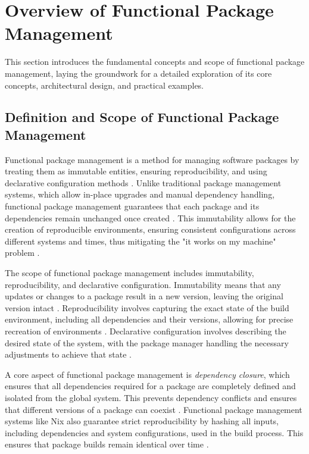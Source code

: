\section{Overview of Functional Package Management}

This section introduces the fundamental concepts and scope of functional package
management, laying the groundwork for a detailed exploration of its core concepts,
architectural design, and practical examples.

\subsection{Definition and Scope of Functional Package Management}

Functional package management is a method for managing software packages by treating
them as immutable entities, ensuring reproducibility, and using declarative configuration
methods \cite[Section 2.1]{courtesFunctionalPackageManagement2013}. Unlike traditional
package management systems, which allow in-place upgrades and manual dependency handling,
functional package management guarantees that each package and its dependencies remain
unchanged once created \cite[Section 2.2]{courtesFunctionalPackageManagement2013}.
This immutability allows for the creation of reproducible environments, ensuring
consistent configurations across different systems and times, thus mitigating the
"it works on my machine" problem \cite[Section 2, Page 5]{rahmanWorksMeCannot2022}.

The scope of functional package management includes immutability, reproducibility,
and declarative configuration. Immutability means that any updates or changes to a
package result in a new version, leaving the original version intact
\cite[Page 84]{dolstraNixSafePolicyFree2004}. Reproducibility involves capturing
the exact state of the build environment, including all dependencies and their
versions, allowing for precise recreation of environments
\cite[Section 2.1]{courtesFunctionalPackageManagement2013}. Declarative configuration
involves describing the desired state of the system, with the package manager handling
the necessary adjustments to achieve that state \cite[Section 2.1]{courtesFunctionalPackageManagement2013}.

A core aspect of functional package management is \textit{dependency closure}, which
ensures that all dependencies required for a package are completely defined and isolated
from the global system. This prevents dependency conflicts and ensures that different
versions of a package can coexist \cite[Chapter 3.3]{dolstraPurelyFunctionalSoftware2006}.
Functional package management systems like Nix also guarantee strict reproducibility by
hashing all inputs, including dependencies and system configurations, used in the build
process. This ensures that package builds remain identical over time
\cite[Section 2.2]{courtesFunctionalPackageManagement2013}.

